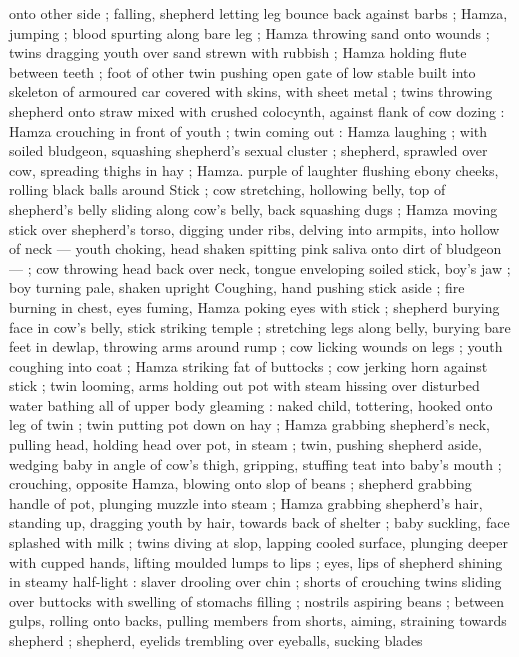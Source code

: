 onto other side ; falling, shepherd letting leg bounce back against 
barbs ; Hamza, jumping ; blood spurting along bare leg ; Hamza 
throwing sand onto wounds ; twins dragging youth over sand strewn 
with rubbish ; Hamza holding flute between teeth ; foot of other twin 
pushing open gate of low stable built into skeleton of armoured car 
covered with skins, with sheet metal ; twins throwing shepherd onto 
straw mixed with crushed colocynth, against flank of cow dozing : 
Hamza crouching in front of youth ; twin coming out : Hamza 
laughing ; with soiled bludgeon, squashing shepherd's sexual cluster 
; shepherd, sprawled over cow, spreading thighs in hay ; Hamza. 
purple of laughter flushing ebony cheeks, rolling black balls around 
Stick ; cow stretching, hollowing belly, top of shepherd's belly sliding 
along cow's belly, back squashing dugs ; Hamza moving stick over 
shepherd's torso, digging under ribs, delving into armpits, into 
hollow of neck --- youth choking, head shaken spitting pink saliva 
onto dirt of bludgeon --- ; cow throwing head back over neck, tongue 
enveloping soiled stick, boy's jaw ; boy turning pale, shaken upright 
Coughing, hand pushing stick aside ; fire burning in chest, eyes 
fuming, Hamza poking eyes with stick ; shepherd burying face in 
cow's belly, stick striking temple ; stretching legs along belly, burying 
bare feet in dewlap, throwing arms around rump ; cow licking wounds 
on legs ; youth coughing into coat ; Hamza striking fat of buttocks ; 
cow jerking horn against stick ; twin looming, arms holding out pot 
with steam hissing over disturbed water bathing all of upper body 
gleaming : naked child, tottering, hooked onto leg of twin ; twin 
putting pot down on hay ; Hamza grabbing shepherd's neck, pulling 
head, holding head over pot, in steam ; twin, pushing shepherd 
aside, wedging baby in angle of cow's thigh, gripping, stuffing teat 
into baby's mouth ; crouching, opposite Hamza, blowing onto slop of 
beans ; shepherd grabbing handle of pot, plunging muzzle into 
steam ; Hamza grabbing shepherd's hair, standing up, dragging 
youth by hair, towards back of shelter ; baby suckling, face splashed 
with milk ; twins diving at slop, lapping cooled surface, plunging 
deeper with cupped hands, lifting moulded lumps to lips ; eyes, lips 
of shepherd shining in steamy half-light : slaver drooling over chin ; 
shorts of crouching twins sliding over buttocks with swelling of 
stomachs filling ; nostrils aspiring beans ; between gulps, rolling onto 
backs, pulling members from shorts, aiming, straining towards 
shepherd ; shepherd, eyelids trembling over eyeballs, sucking blades 
